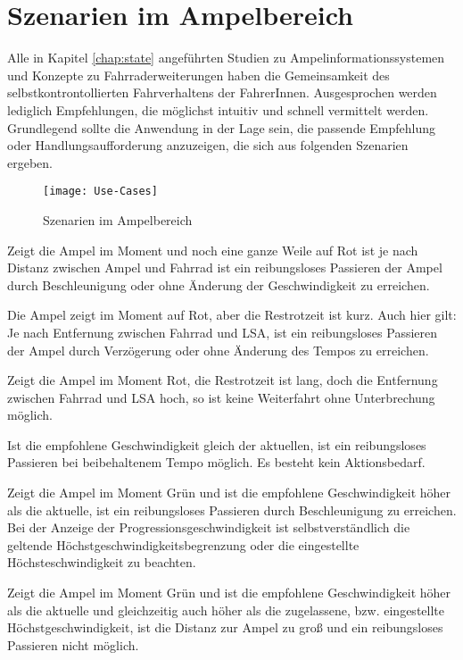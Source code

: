 \chapter{\label{chap:szenarien}Szenarien im Ampelbereich}
Alle in Kapitel \ref{chap:state} angeführten Studien zu Ampelinformationssystemen und Konzepte zu Fahrraderweiterungen haben die Gemeinsamkeit des selbstkontrontollierten Fahrverhaltens der FahrerInnen. Ausgesprochen werden lediglich Empfehlungen, die möglichst intuitiv und schnell vermittelt werden. Grundlegend sollte die Anwendung in der Lage sein, die passende Empfehlung oder Handlungsaufforderung anzuzeigen, die sich aus folgenden Szenarien ergeben.
\begin{figure}[H]  
    \centering  
    \texttt{[image: Use-Cases]} 
    \caption[Szenarien]{Szenarien im Ampelbereich}
    \label{fig:szenarien}
\end{figure}
\begin{description}[leftmargin=0.7cm,style=nextline]
\item[Szenario R1:] 
Zeigt die Ampel im Moment und noch eine ganze Weile auf Rot ist je nach Distanz zwischen Ampel und Fahrrad ist ein reibungsloses Passieren der Ampel durch Beschleunigung oder ohne Änderung der Geschwindigkeit zu erreichen.\\
\item[Szenario R2:] 
Die Ampel zeigt im Moment auf Rot, aber die Restrotzeit ist kurz. Auch hier gilt: Je nach Entfernung zwischen Fahrrad und \gls{LSA}, ist ein reibungsloses Passieren der Ampel durch Verzögerung oder ohne Änderung des Tempos zu erreichen.\\
\item[Szenario R3:] 
Zeigt die Ampel im Moment Rot, die Restrotzeit ist lang, doch die Entfernung zwischen Fahrrad und \gls{LSA} hoch, so ist keine Weiterfahrt ohne Unterbrechung möglich.\\
\item[Szenario G1:] Ist die empfohlene Geschwindigkeit gleich der aktuellen, ist ein reibungsloses Passieren bei beibehaltenem Tempo möglich. Es besteht kein Aktionsbedarf.\\
\item[Szenario G2:] 
Zeigt die Ampel im Moment Grün und ist die empfohlene Geschwindigkeit höher als die aktuelle, ist ein reibungsloses Passieren durch Beschleunigung zu erreichen. Bei der Anzeige der Progressionsgeschwindigkeit ist selbstverständlich die geltende Höchstgeschwindigkeitsbegrenzung oder die eingestellte Höchsteschwindigkeit zu beachten.\\ 
\item[Szenario G3:] 
Zeigt die Ampel im Moment Grün und ist die empfohlene Geschwindigkeit höher als die aktuelle und gleichzeitig auch höher als die zugelassene, bzw. eingestellte Höchstgeschwindigkeit, ist die Distanz zur Ampel zu groß und ein reibungsloses Passieren nicht möglich.
\end{description}
